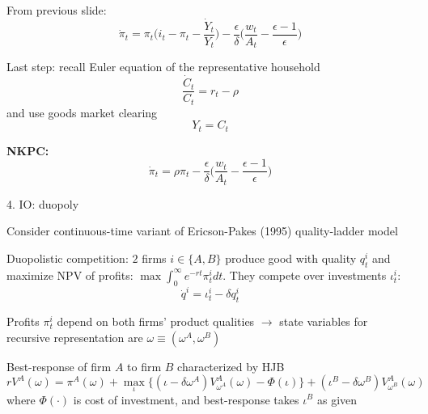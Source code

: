 \documentclass[11pt, aspectratio=169]{beamer}
\newenvironment{witemize}{\itemize\addtolength{\itemsep}{10pt}}{\enditemize}
\begin{document}
\begin{frame}{}
\begin{witemize}

\item From previous slide: 
\begin{equation*}
	 \dot \pi_t = \pi_t \bigg( i_t -  \pi_t - \frac{\dot Y_t}{Y_t} \bigg) - \frac{\epsilon}{\delta} \bigg( \frac{w_t}{A_t} - \frac{\epsilon - 1}{\epsilon} \bigg)
\end{equation*}

\item Last step: recall Euler equation of the representative household
\begin{equation*}
	\frac{\dot C_t}{C_t} = r_t - \rho
\end{equation*}
and use goods market clearing
\begin{equation*}
	Y_t = C_t
\end{equation*}

\item \textbf{NKPC:}
\begin{equation*}
	 \dot \pi_t = \rho \pi_t - \frac{\epsilon}{\delta} \bigg( \frac{w_t}{A_t} - \frac{\epsilon - 1}{\epsilon} \bigg)
\end{equation*}
\end{witemize}
\end{frame}


\begin{frame}{4. IO: duopoly} 

\begin{witemize}
\item Consider continuous-time variant of Ericson-Pakes (1995) quality-ladder model 

\item Duopolistic competition: $2$ firms $i \in \{A, B\}$ produce good with quality $q_t^i$ and maximize NPV of profits: $\max \int_0^\infty e^{- rt} \pi_t^i dt$. They compete over investments $\iota_t^i$:
\begin{equation*}
	\dot q^i = \iota_t^i - \delta q_t^i
\end{equation*}


\item Profits $\pi_t^i$ depend on both firms' product qualities $\rightarrow$ state variables for recursive representation are $\omega \equiv (\omega^A, \omega^B)$

\item Best-response of firm $A$ to firm $B$ characterized by HJB
\begin{equation*}
	r V^A(\omega) = \pi^A(\omega) + \max_\iota \Big\{ (\iota - \delta \omega^A) V_{\omega^A}^A(\omega) - \Phi(\iota) \Big\} + (\iota^B - \delta \omega^B) V_{\omega^B}^A(\omega) 
\end{equation*}
where $\Phi(\cdot)$ is cost of investment, and best-response takes $\iota^B$ as given
\end{witemize}
\end{frame}
\end{document}
